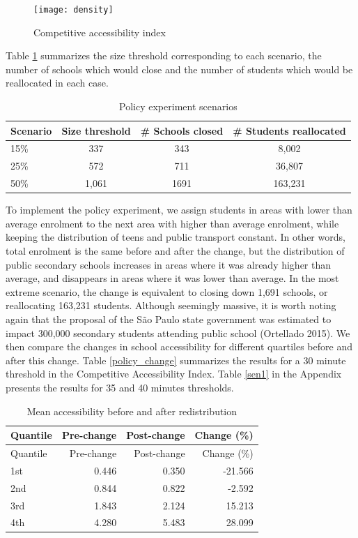\documentclass[3p,authoryear,preprint,review,12pt]{elsarticle}
\begin{document}
\begin{figure}[H]
\texttt{[image: density]} \caption{Competitive accessibility index}\label{fig:density}
\end{figure}

Table \ref{thresholds} summarizes the size threshold corresponding to each scenario, the number of schools which would close and the number of students which would be reallocated in each case. 

\begin{table}[H]\caption{Policy experiment scenarios}\label{thresholds}
\begin{tabular}[c]{lccc}\hline
Scenario & Size threshold & \# Schools closed & \# Students reallocated \\ \hline
15\% & 337 & 343 & 8,002 \\
25\% & 572 & 711 & 36,807 \\
50\% & 1,061 & 1691 & 163,231 \\\hline
\end{tabular}
\end{table}

To implement the policy experiment, we assign students in areas with
lower than average enrolment to the next area with higher than average enrolment, while keeping the distribution of teens and public transport constant. In other words, total enrolment is the same before and after the change, but the distribution of public secondary schools increases in areas where it was already higher than average, and disappears in areas where it was lower than average. In the most extreme scenario, the change is equivalent to closing down 1,691 schools, or reallocating 163,231 students. Although seemingly massive, it is worth noting again that the proposal of the São Paulo state government was estimated to impact 300,000 secondary students attending public school (Ortellado 2015). We then compare the changes in school accessibility for different quartiles before and after this change. Table \ref{policy_change} summarizes the results for a 30 minute threshold in the Competitive Accessibility Index. Table \ref{sen1} in the Appendix presents the results for 35 and 40 minutes thresholds.

\begin{longtable}[H]{@{}lrrr@{}} 
\caption{Mean accessibility before and after
redistribution}\tabularnewline
\toprule
Quantile & Pre-change & Post-change & Change (\%)\tabularnewline
\midrule
\endfirsthead
\toprule
Quantile & Pre-change & Post-change & Change (\%)\tabularnewline
\midrule
\endhead
1st & 0.446 & 0.350 & -21.566\tabularnewline
2nd & 0.844 & 0.822 & -2.592\tabularnewline
3rd & 1.843 & 2.124 & 15.213\tabularnewline
4th & 4.280 & 5.483 & 28.099\tabularnewline
\bottomrule
\end{longtable} \label{policy_change}
\end{document}
